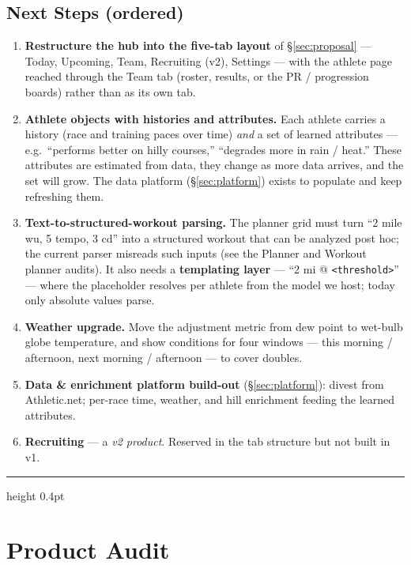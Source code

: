 \documentclass[11pt]{article}
\newcommand{\code}[1]{\texttt{\small #1}}
\begin{document}
\subsection*{Next Steps (ordered)}
\begin{enumerate}
  \item \textbf{Restructure the hub into the five-tab layout} of
    \S\ref{sec:proposal} --- Today, Upcoming, Team, Recruiting (v2), Settings
    --- with the athlete page reached through the Team tab (roster, results,
    or the PR / progression boards) rather than as its own tab.
  \item \textbf{Athlete objects with histories and attributes.} Each athlete
    carries a history (race and training paces over time) \emph{and} a set of
    learned attributes --- e.g.\ ``performs better on hilly courses,''
    ``degrades more in rain / heat.'' These attributes are estimated from data,
    they change as more data arrives, and the set will grow. The data platform
    (\S\ref{sec:platform}) exists to populate and keep refreshing them.
  \item \textbf{Text-to-structured-workout parsing.} The planner grid must turn
    ``2 mile wu, 5 tempo, 3 cd'' into a structured workout that can be analyzed
    post hoc; the current parser misreads such inputs (see the Planner and
    Workout planner audits). It also needs a \textbf{templating layer} ---
    ``2 mi @ \code{<threshold>}'' --- where the placeholder resolves per
    athlete from the model we host; today only absolute values parse.
  \item \textbf{Weather upgrade.} Move the adjustment metric from dew point to
    wet-bulb globe temperature, and show conditions for four windows --- this
    morning / afternoon, next morning / afternoon --- to cover doubles.
  \item \textbf{Data \& enrichment platform build-out} (\S\ref{sec:platform}):
    divest from Athletic.net; per-race time, weather, and hill enrichment
    feeding the learned attributes.
  \item \textbf{Recruiting} --- a \emph{v2 product}. Reserved in the tab
    structure but not built in v1.
\end{enumerate}

\vspace{0.4em}
\hrule height 0.4pt
\vspace{0.6em}

\section{Product Audit}
\end{document}
